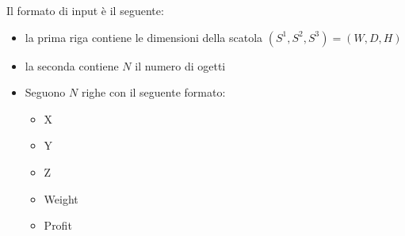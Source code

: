 \documentclass{scrartcl}
\begin{document}
Il formato di input è il seguente:
\begin{itemize}
	\item la prima riga contiene le dimensioni della scatola $(S^1, S^2, S^3) = (W, D, H)$
	\item la seconda contiene $N$ il numero di ogetti
	\item Seguono $N$ righe con il seguente formato:
	\begin{itemize}
		\item X 
		\item Y
		\item Z
		\item Weight
		\item Profit
	\end{itemize}
\end{itemize}
\end{document}

